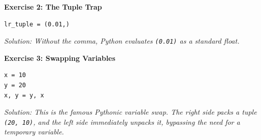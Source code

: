 \vspace{1em}
\textbf{Exercise 2: The Tuple Trap}
\begin{lstlisting}
lr_tuple = (0.01,)
\end{lstlisting}
\textit{Solution: Without the comma, Python evaluates \texttt{(0.01)} as a standard float.}

\vspace{1em}
\textbf{Exercise 3: Swapping Variables}
\begin{lstlisting}
x = 10
y = 20
x, y = y, x
\end{lstlisting}
\textit{Solution: This is the famous Pythonic variable swap. The right side packs a tuple \texttt{(20, 10)}, and the left side immediately unpacks it, bypassing the need for a temporary variable.}
